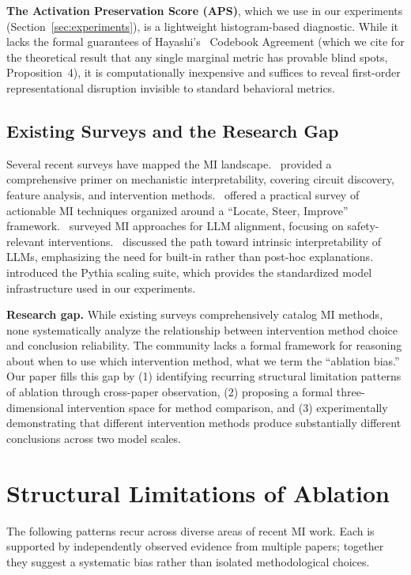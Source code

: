 \documentclass[pdflatex,sn-mathphys-num]{sn-jnl}
\begin{document}
\textbf{The Activation Preservation Score (APS)}, which we use in our experiments (Section~\ref{sec:experiments}), is a lightweight histogram-based diagnostic. While it lacks the formal guarantees of Hayashi's~\cite{Hayashi2026} Codebook Agreement (which we cite for the theoretical result that any single marginal metric has provable blind spots, Proposition~4), it is computationally inexpensive and suffices to reveal first-order representational disruption invisible to standard behavioral metrics.


\subsection{Existing Surveys and the Research Gap}

Several recent surveys have mapped the MI landscape.~\cite{Ferrando2024} provided a comprehensive primer on mechanistic interpretability, covering circuit discovery, feature analysis, and intervention methods.~\cite{LSI2026} offered a practical survey of actionable MI techniques organized around a ``Locate, Steer, Improve'' framework.~\cite{Naseem2026} surveyed MI approaches for LLM alignment, focusing on safety-relevant interventions.~\cite{ACL2026Intrinsic} discussed the path toward intrinsic interpretability of LLMs, emphasizing the need for built-in rather than post-hoc explanations.~\cite{Biderman2023} introduced the Pythia scaling suite, which provides the standardized model infrastructure used in our experiments.

\textbf{Research gap.} While existing surveys comprehensively catalog MI methods, none systematically analyze the relationship between intervention method choice and conclusion reliability. The community lacks a formal framework for reasoning about when to use which intervention method, what we term the ``ablation bias.'' Our paper fills this gap by (1) identifying recurring structural limitation patterns of ablation through cross-paper observation, (2) proposing a formal three-dimensional intervention space for method comparison, and (3) experimentally demonstrating that different intervention methods produce substantially different conclusions across two model scales.

\section{Structural Limitations of Ablation}
\label{sec:patterns}

The following patterns recur across diverse areas of recent MI work. Each is supported by independently observed evidence from multiple papers; together they suggest a systematic bias rather than isolated methodological choices.
\end{document}
